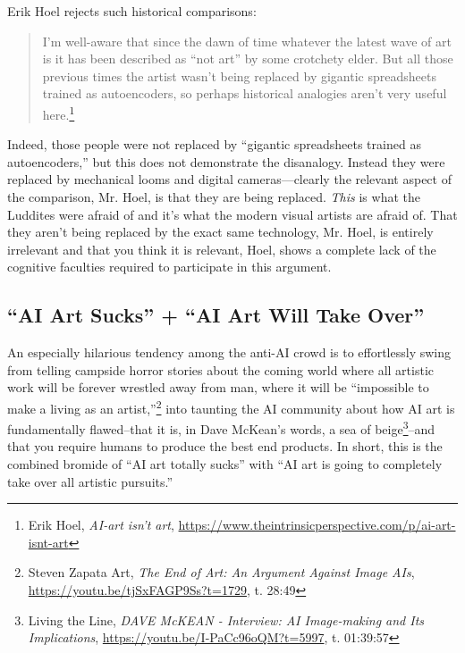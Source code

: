 \documentclass[11pt]{article}
\begin{document}
Erik Hoel rejects such historical comparisons:
\begin{quote}
I’m well-aware that since the dawn of time whatever the latest wave of art is it has been described as “not art” by some crotchety elder. But all those previous times the artist wasn’t being replaced by gigantic spreadsheets trained as autoencoders, so perhaps historical analogies aren’t very useful here.\footnote{Erik Hoel, \emph{AI-art isn't art}, \url{https://www.theintrinsicperspective.com/p/ai-art-isnt-art}}
\end{quote}

Indeed, those people were not replaced by ``gigantic spreadsheets trained as autoencoders,'' but this does not demonstrate the disanalogy. Instead they were replaced by mechanical looms and digital cameras---clearly the relevant aspect of the comparison, Mr. Hoel, is that they are being replaced. \emph{This} is what the Luddites were afraid of and it's what the modern visual artists are afraid of. That they aren't being replaced by the exact same technology, Mr. Hoel, is entirely irrelevant and that you think it is relevant, Hoel, shows a complete lack of the cognitive faculties required to participate in this argument.

\subsection*{``AI Art Sucks'' + ``AI Art Will Take Over''}
\label{sec:org0a65829}
An especially hilarious tendency among the anti-AI crowd is to effortlessly swing from telling campside horror stories about the coming world where all artistic work will be forever wrestled away from man, where it will be ``impossible to make a living as an artist,''\footnote{Steven Zapata Art, \emph{The End of Art: An Argument Against Image AIs}, \url{https://youtu.be/tjSxFAGP9Ss?t=1729}, t. 28:49} into taunting the AI community about how AI art is fundamentally flawed--that it is, in Dave McKean's words, a sea of beige\footnote{Living the Line, \emph{DAVE McKEAN - Interview: AI Image-making and Its Implications}, \url{https://youtu.be/I-PaCc96oQM?t=5997}, t. 01:39:57}--and that you require humans to produce the best end products. In short, this is the combined bromide of ``AI art totally sucks'' with ``AI art is going to completely take over all artistic pursuits.''
\end{document}
